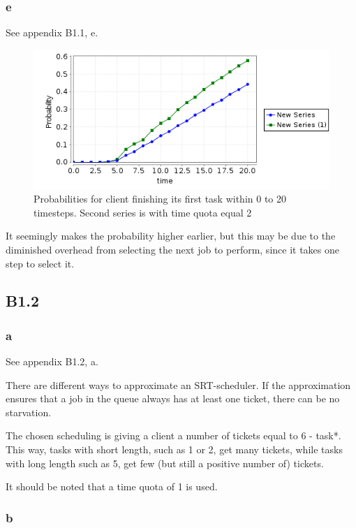 \subsubsection{e}

See appendix B1.1, e.

\begin{figure}[!htb]
\centering
\includegraphics[scale=.75]{images/B1_1_e.png}
\caption{Probabilities for client finishing its first task within 0 to 20 timesteps.
Second series is with time quota equal 2}
\label{fig:nojobprop}
\end{figure}

It seemingly makes the probability higher earlier,
but this may be due to the diminished overhead
from selecting the next job to perform,
since it takes one step to select it.

\subsection{B1.2}

\subsubsection{a}

See appendix B1.2, a.

There are different ways to approximate an SRT-scheduler.
If the approximation ensures that a job in the queue always
has at least one ticket, there can be no starvation.

The chosen scheduling is giving a client a number of tickets
equal to 6 - task*.
This way, tasks with short length, such as 1 or 2,
get many tickets, while tasks with long length such as 5,
get few (but still a positive number of) tickets.

It should be noted that a time quota of 1 is used.

\subsubsection{b}

